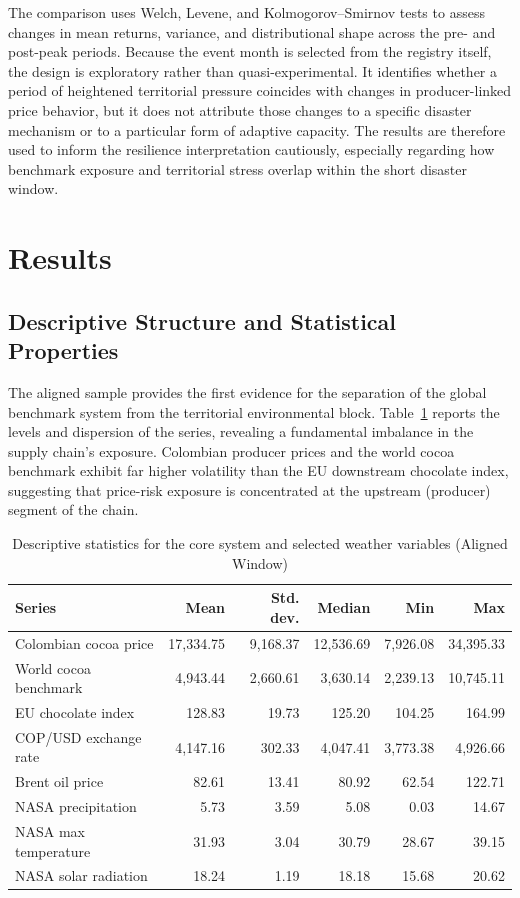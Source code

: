 \documentclass[11pt]{article}
\begin{document}
The comparison uses Welch, Levene, and Kolmogorov--Smirnov tests to assess changes in mean returns, variance, and distributional shape across the pre- and post-peak periods. Because the event month is selected from the registry itself, the design is exploratory rather than quasi-experimental. It identifies whether a period of heightened territorial pressure coincides with changes in producer-linked price behavior, but it does not attribute those changes to a specific disaster mechanism or to a particular form of adaptive capacity. The results are therefore used to inform the resilience interpretation cautiously, especially regarding how benchmark exposure and territorial stress overlap within the short disaster window.

\section{Results}
\label{sec:results}

\subsection{Descriptive Structure and Statistical Properties}

The aligned sample provides the first evidence for the separation of the global benchmark system from the territorial environmental block. Table~\ref{tab:descriptive_stats} reports the levels and dispersion of the series, revealing a fundamental imbalance in the supply chain's exposure. Colombian producer prices and the world cocoa benchmark exhibit far higher volatility than the EU downstream chocolate index, suggesting that price-risk exposure is concentrated at the upstream (producer) segment of the chain.

\begin{table}[H]
\centering
\caption{Descriptive statistics for the core system and selected weather variables (Aligned Window)}
\label{tab:descriptive_stats}
\small
\begin{tabular}{p{4.0cm}rrrrr}
\toprule
Series & Mean & Std. dev. & Median & Min & Max \\
\midrule
Colombian cocoa price & 17{,}334.75 & 9{,}168.37 & 12{,}536.69 & 7{,}926.08 & 34{,}395.33 \\
World cocoa benchmark & 4{,}943.44 & 2{,}660.61 & 3{,}630.14 & 2{,}239.13 & 10{,}745.11 \\
EU chocolate index & 128.83 & 19.73 & 125.20 & 104.25 & 164.99 \\
COP/USD exchange rate & 4{,}147.16 & 302.33 & 4{,}047.41 & 3{,}773.38 & 4{,}926.66 \\
Brent oil price & 82.61 & 13.41 & 80.92 & 62.54 & 122.71 \\
NASA precipitation & 5.73 & 3.59 & 5.08 & 0.03 & 14.67 \\
NASA max temperature & 31.93 & 3.04 & 30.79 & 28.67 & 39.15 \\
NASA solar radiation & 18.24 & 1.19 & 18.18 & 15.68 & 20.62 \\
\bottomrule
\end{tabular}
\end{table}
\end{document}
